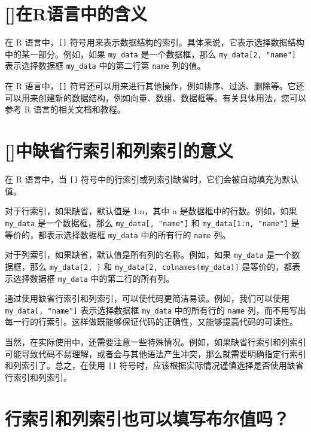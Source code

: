 \documentclass[
  letterpaper,
  DIV=11,
  numbers=noendperiod]{scrreprt}
\begin{document}
\section{{[}{]}在R语言中的含义}\label{ux5728rux8bedux8a00ux4e2dux7684ux542bux4e49-1}

在 R 语言中，\texttt{{[}{]}}
符号用来表示数据结构的索引。具体来说，它表示选择数据结构中的某一部分。例如，如果
\texttt{my\_data} 是一个数据框，那么 \texttt{my\_data{[}2,\ "name"{]}}
表示选择数据框 \texttt{my\_data} 中的第二行第 \texttt{name} 列的值。

在 R 语言中，\texttt{{[}{]}}
符号还可以用来进行其他操作，例如排序、过滤、删除等。它还可以用来创建新的数据结构，例如向量、数组、数据框等。有关具体用法，您可以参考
R 语言的相关文档和教程。

\section{{[}{]}中缺省行索引和列索引的意义}\label{ux4e2dux7f3aux7701ux884cux7d22ux5f15ux548cux5217ux7d22ux5f15ux7684ux610fux4e49-1}

在 R 语言中，当 \texttt{{[}{]}}
符号中的行索引或列索引缺省时，它们会被自动填充为默认值。

对于行索引，如果缺省，默认值是 1:n，其中 n 是数据框中的行数。例如，如果
\texttt{my\_data} 是一个数据框，那么 \texttt{my\_data{[},\ "name"{]}} 和
\texttt{my\_data{[}1:n,\ "name"{]}} 是等价的，都表示选择数据框
\texttt{my\_data} 中的所有行的 \texttt{name} 列。

对于列索引，如果缺省，默认值是所有列的名称。例如，如果 \texttt{my\_data}
是一个数据框，那么 \texttt{my\_data{[}2,\ {]}} 和
\texttt{my\_data{[}2,\ colnames(my\_data){]}} 是等价的，都表示选择数据框
\texttt{my\_data} 中的第二行的所有列。

通过使用缺省行索引和列索引，可以使代码更简洁易读。例如，我们可以使用
\texttt{my\_data{[},\ "name"{]}} 表示选择数据框 \texttt{my\_data}
中的所有行的 \texttt{name}
列，而不用写出每一行的行索引。这样做既能够保证代码的正确性，又能够提高代码的可读性。

当然，在实际使用中，还需要注意一些特殊情况。例如，如果缺省行索引和列索引可能导致代码不易理解，或者会与其他语法产生冲突，那么就需要明确指定行索引和列索引了。总之，在使用
\texttt{{[}{]}}
符号时，应该根据实际情况谨慎选择是否使用缺省行索引和列索引。

\section{行索引和列索引也可以填写布尔值吗？}\label{ux884cux7d22ux5f15ux548cux5217ux7d22ux5f15ux4e5fux53efux4ee5ux586bux5199ux5e03ux5c14ux503cux5417-1}
\end{document}
